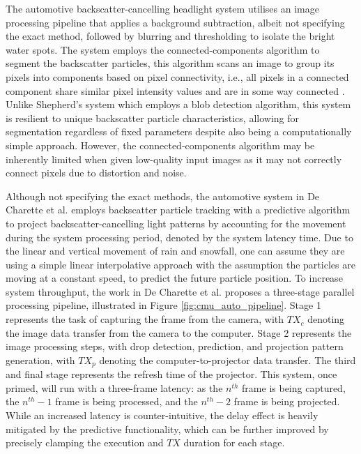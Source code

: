 The automotive backscatter-cancelling headlight system utilises an image processing pipeline that applies a background subtraction, albeit not specifying the exact method, followed by blurring and thresholding to isolate the bright water spots. The system employs the connected-components algorithm to segment the backscatter particles, this algorithm scans an image to group its pixels into components based on pixel connectivity, i.e., all pixels in a connected component share similar pixel intensity values and are in some way connected \cite{robertfisherConnectedComponentsLabeling2003}. Unlike Shepherd's system which employs a blob detection algorithm, this system is resilient to unique backscatter particle characteristics, allowing for segmentation regardless of fixed parameters despite also being a computationally simple approach. However, the connected-components algorithm may be inherently limited when given low-quality input images as it may not correctly connect pixels due to distortion and noise.

Although not specifying the exact methods, the automotive system in De Charette et al. employs backscatter particle tracking with a predictive algorithm to project backscatter-cancelling light patterns by accounting for the movement during the system processing period, denoted by the system latency time. Due to the linear and vertical movement of rain and snowfall, one can assume they are using a simple linear interpolative approach with the assumption the particles are moving at a constant speed, to predict the future particle position. To increase system throughput, the work in De Charette et al. proposes a three-stage parallel processing pipeline, illustrated in Figure \ref{fig:cmu_auto_pipeline}. Stage 1 represents the task of capturing the frame from the camera, with $TX_c$ denoting the image data transfer from the camera to the computer. Stage 2 represents the image processing steps, with drop detection, prediction, and projection pattern generation, with $TX_p$ denoting the computer-to-projector data transfer. The third and final stage represents the refresh time of the projector. This system, once primed, will run with a three-frame latency: as the $n^{th}$ frame is being captured, the $n^{th} - 1$ frame is being processed, and the $n^{th} - 2$ frame is being projected. While an increased latency is counter-intuitive, the delay effect is heavily mitigated by the predictive functionality, which can be further improved by precisely clamping the execution and $TX$ duration for each stage.

